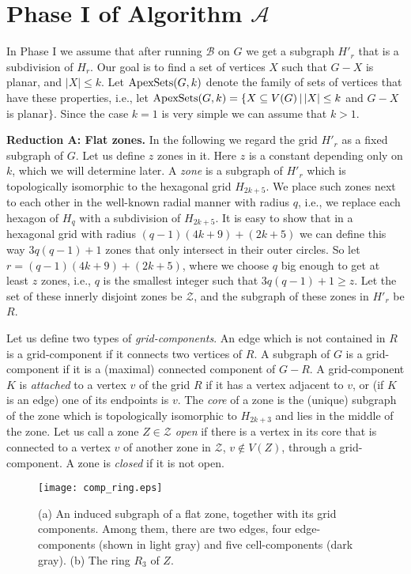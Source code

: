 \documentclass{llncs}
\begin{document}
\section{Phase I of Algorithm $\mathcal{A}$}
\label{phase_I}

In Phase I we assume that after running $\mathcal{B}$ on $G$ we
get a subgraph $H'_r$ that is a subdivision of $H_r$.
Our goal is to find a set of vertices $X$ such that $G-X$ is planar, and $|X| \leq k$.
Let $\textup{ApexSets}(G,k)$ denote the family of sets of vertices that have these
properties, i.e., let
$\textup{ApexSets}(G,k)=\{ X \subseteq V(G) \, | \, |X| \leq k$ and
$G-X$ is planar$\}$.
Since the case $k=1$ is very simple we can assume that $k > 1$.

\textbf{Reduction A: Flat zones.}
In the following we regard the grid $H'_r$ as a fixed subgraph of $G$.
Let us define $z$ zones in it. Here $z$ is a constant
depending only on $k$, which we will determine later.
A \emph{zone} is a subgraph of $H'_r$ which is topologically isomorphic
to the hexagonal grid $H_{2k+5}$. We place such zones next to each other in the well-known
radial manner with radius $q$, i.e., we replace each hexagon of $H_q$ with a subdivision of $H_{2k+5}$.
It is easy to show that in a hexagonal grid with radius ${(q-1)(4k+9)+(2k+5)}$
we can define this way $3q(q-1)+1$ zones that only intersect in their outer circles.
So let $r=(q-1)(4k+9)+(2k+5)$, where we choose $q$ big enough to get at least $z$ zones,
i.e., $q$ is the smallest integer such that $3q(q-1)+1 \geq z$.
Let the set of these innerly disjoint zones be $\mathcal{Z}$, and the
subgraph of these zones in $H'_r$ be $R$.

Let us define two types of \emph{grid-components}.
An edge which is not contained in $R$ is a grid-component if it connects
two vertices of $R$. A subgraph of $G$ is a grid-component if it is a (maximal) connected component of $G-R$.
A grid-component $K$ is \emph{attached} to a vertex $v$ of the grid $R$ if it has a vertex adjacent to $v$, or
(if $K$ is an edge) one of its endpoints is $v$.
The \emph{core} of a zone is the (unique) subgraph of the zone which is topologically
isomorphic to $H_{2k+3}$ and lies in the middle of the zone.
Let us call a zone $Z \in \mathcal{Z}$ \emph{open} if there is a vertex in its core that is connected to
a vertex $v$ of another zone in $\mathcal{Z}$, $v \notin V(Z)$, through a grid-component.
A zone is \emph{closed} if it is not open.

\begin{figure}[t]
\begin{center}
\texttt{[image: comp\_ring.eps]}
\end{center}
\caption{(a) An induced subgraph of a flat zone, together with its grid components.
Among them, there are two edges, four edge-components (shown in light gray) and five cell-components (dark gray).
(b) The ring $R_3$ of $Z$.}
\label{fig_comp_ring}
\end{figure}
\end{document}
